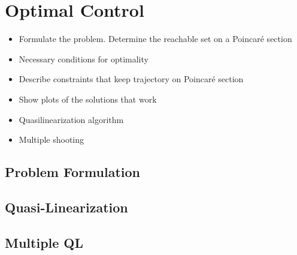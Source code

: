 \section{Optimal Control}

\begin{itemize}
	\item Formulate the problem. Determine the reachable set on a Poincar\'e section
	\item Necessary conditions for optimality
	\item Describe constraints that keep trajectory on Poincar\'e section
	\item Show plots of the solutions that work
	\item Quasilinearization algorithm
	\item Multiple shooting
\end{itemize}
\subsection{Problem Formulation}

\subsection{Quasi-Linearization}

\subsection{Multiple QL}
